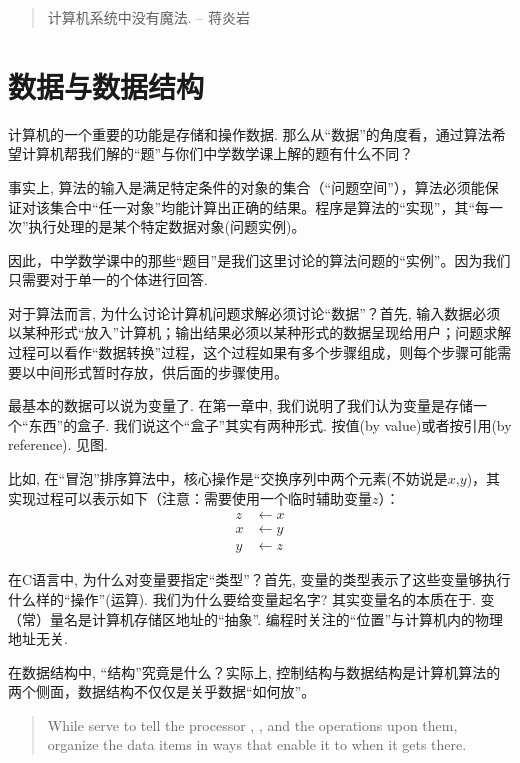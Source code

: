 \begin{quote}
	计算机系统中没有魔法. \hfill -- 蒋炎岩
\end{quote}



\section{数据与数据结构}


计算机的一个重要的功能是存储和操作数据. 那么从“数据”的角度看，通过算法希望计算机帮我们解的“题”与你们中学数学课上解的题有什么不同？

事实上, 算法的输入是满足特定条件的对象的集合（“问题空间”），算法必须能保证对该集合中“任一对象”均能计算出正确的结果。程序是算法的“实现”，其“每一次”执行处理的是某个特定数据对象(问题实例)。

因此，中学数学课中的那些“题目”是我们这里讨论的算法问题的“实例”。因为我们只需要对于单一的个体进行回答. 

对于算法而言, 为什么讨论计算机问题求解必须讨论“数据”？首先, 输入数据必须以某种形式“放入”计算机；输出结果必须以某种形式的数据呈现给用户；问题求解过程可以看作“数据转换”过程，这个过程如果有多个步骤组成，则每个步骤可能需要以中间形式暂时存放，供后面的步骤使用。

最基本的数据可以说为变量了. 在第一章中, 我们说明了我们认为变量是存储一个``东西''的盒子. 我们说这个``盒子''其实有两种形式. 按值(by value)或者按引用(by reference). 见图. 


比如, 在“冒泡”排序算法中，核心操作是“交换序列中两个元素(不妨说是$x$,$y$)，其实现过程可以表示如下（注意：需要使用一个临时辅助变量$z$）：
$$
\begin{aligned}
z&\leftarrow x\\
x&\leftarrow y\\
y&\leftarrow z	
\end{aligned}
$$

在C语言中, 为什么对变量要指定“类型”？首先, 变量的类型表示了这些变量够执行什么样的“操作”(运算). 我们为什么要给变量起名字? 其实变量名的本质在于. 变（常）量名是计算机存储区地址的“抽象”. 编程时关注的“位置”与计算机内的物理地址无关.

在数据结构中, “结构”究竟是什么？实际上, 控制结构与数据结构是计算机算法的两个侧面，数据结构不仅仅是关乎数据“如何放”。

\begin{quote}
	While  serve to tell the processor , , and the operations upon them, organize the data items in ways that enable it to  when it gets there.
\end{quote}

